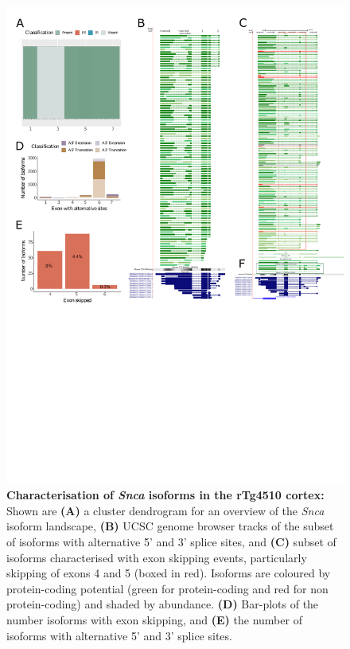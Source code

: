 \begin{figure}[htp]
	\centering
	\includegraphics[page=7,trim={0 10cm 0 0},scale = 0.85]{Figures/TargetGenes_Annotation_Portrait.pdf}
	\captionsetup{width=0.95\textwidth}
	\caption[Characterisation of \textit{Snca} isoforms in the rTg4510 cortex]%
	{\textbf{Characterisation of \textit{Snca} isoforms in the rTg4510 cortex:} Shown are \textbf{(A)} a cluster dendrogram for an overview of the \textit{Snca} isoform landscape, \textbf{(B)} UCSC genome browser tracks of the subset of isoforms with alternative 5' and 3' splice sites, and \textbf{(C)} subset of isoforms characterised with exon skipping events, particularly skipping of exons 4 and 5 (boxed in red). Isoforms are coloured by protein-coding potential (green for protein-coding and red for non protein-coding) and shaded by abundance. \textbf{(D)} Bar-plots of the number isoforms with exon skipping, and \textbf{(E)} the number of isoforms with alternative 5' and 3' splice sites.}    
	\label{fig:snca}
\end{figure}
\restoregeometry


